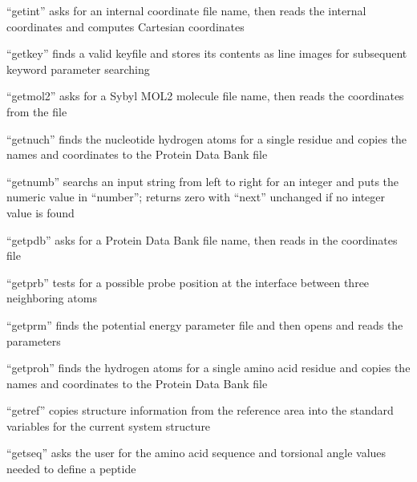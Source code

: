 \documentclass[letterpaper,11pt,english]{sphinxmanual}
\begin{document}
“getint” asks for an internal coordinate file name, then reads the internal coordinates and computes Cartesian coordinates


“getkey” finds a valid keyfile and stores its contents as line images for subsequent keyword parameter searching


“getmol2” asks for a Sybyl MOL2 molecule file name, then reads the coordinates from the file



“getnuch” finds the nucleotide hydrogen atoms for a single residue and copies the names and coordinates to the Protein Data Bank file


“getnumb” searchs an input string from left to right for an integer and puts the numeric value in “number”; returns zero with “next” unchanged if no integer value is found


“getpdb” asks for a Protein Data Bank file name, then reads in the coordinates file


“getprb” tests for a possible probe position at the interface between three neighboring atoms


“getprm” finds the potential energy parameter file and then opens and reads the parameters


“getproh” finds the hydrogen atoms for a single amino acid residue and copies the names and coordinates to the Protein Data Bank file


“getref” copies structure information from the reference area into the standard variables for the current system structure


“getseq” asks the user for the amino acid sequence and torsional angle values needed to define a peptide

\end{document}
